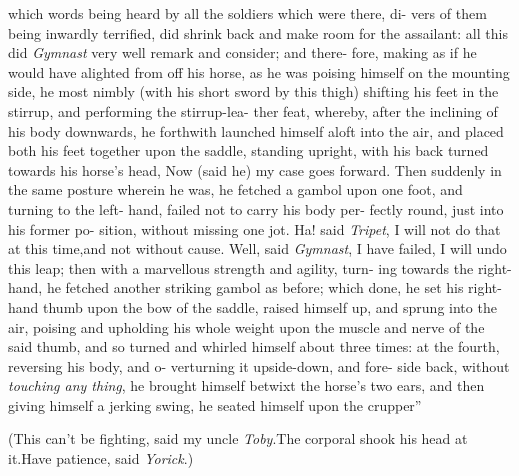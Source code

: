 \documentclass{article}
\begin{document}
\quad\tsh\lqq which words being heard by\break
\lqq all the soldiers which were there, di-\break
\lqq vers of them being inwardly terrified,\break
\lqq did shrink back and make room for\break
\lqq the assailant: all this did \textit{Gymnast} very\break
\lqq well remark and consider; and there-\break
\lqq fore, making as if he would have\break
\lqq alighted from off his horse, as he was\break
\lqq poising himself on the mounting side,\break
\lqq he most nimbly (with his short sword\break
\lqq by this thigh) shifting his feet in the
\lqq stirrup, and performing the stirrup-lea-\break
\lqq ther feat, whereby, after the inclining\break
\lqq of his body downwards, he forthwith\break
\lqq launched himself aloft into the air, and\break
\lqq placed both his feet together upon the\break
\lqq saddle, standing upright, with his\break
\lqq back turned towards his horse’s head,\break
\lqq \tsk Now (said he) my case goes forward.\break
\lqq Then suddenly in the same posture\break
\lqq wherein he was, he fetched a gambol\break
\lqq upon one foot, and turning to the left-\break
\lqq hand, failed not to carry his body per-\break
\lqq fectly round, just into his former po-\break
\lqq sition, without missing one jot.\tsh\break
\lqq Ha!  said \textit{Tripet}, I will not do that\break
\lqq at this time,\tsk and not without cause.\break
\lqq Well, said \textit{Gymnast}, I have failed,\tsk\break
\lqq I will undo this leap; then with a\break
\lqq marvellous strength and agility, turn-\break
\lqq ing towards the right-hand, he fetched\break
\lqq another striking gambol as before;\break
\lqq which done, he set his right-hand\break
\lqq thumb upon the bow of the saddle,
\lqq raised himself up, and sprung into the\break
\lqq air, poising and upholding his whole\break
\lqq weight upon the muscle and nerve of\break
\lqq the said thumb, and so turned and\break
\lqq whirled himself about three times: at\break
\lqq the fourth, reversing his body, and o-\break
\lqq verturning it upside-down, and fore-\break
\lqq side back, without \textit{touching any thing},\break
\lqq he brought himself betwixt the horse’s\break
\lqq two ears, and then giving himself a\break
\lqq jerking swing, he seated himself upon\break
\lqq the crupper\tsh ”

(This can’t be fighting, said my uncle\break
\textit{Toby}.\tsh The corporal shook his head\break
at it.\tsh Have patience, said \textit{Yorick}.)
\end{document}
